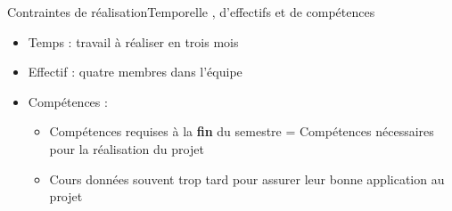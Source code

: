 \begin{frame}{Contraintes de réalisation}{Temporelle , d'effectifs et de
compétences}
\begin{itemize}
  \item Temps : travail à réaliser en trois mois
  \item Effectif : quatre membres dans l'équipe
  \item Compétences :
  \begin{itemize}
    \item Compétences requises à la \textbf {fin} du semestre \newline =
    Compétences nécessaires pour la réalisation du projet
    \item Cours données souvent trop tard pour assurer leur bonne application au
    projet
  \end{itemize}
\end{itemize}
\end{frame}
